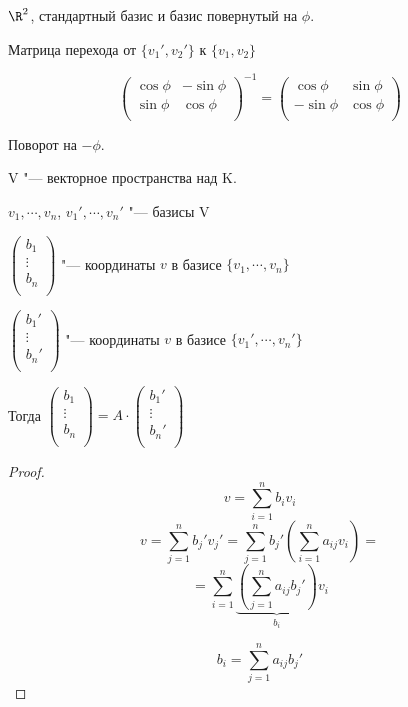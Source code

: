 \begin{exmp}
$\R^2$, стандартный базис и базис повернутый на $\phi$.

Матрица перехода от $\{v_1', v_2'\}$ к $\{v_1, v_2\}$

$$ 
\begin{pmatrix}
\cos \phi & -\sin \phi\\
\sin \phi & \cos \phi\\
\end{pmatrix}^{-1}
=
\begin{pmatrix}
\cos \phi & \sin \phi\\
-\sin \phi & \cos \phi\\
\end{pmatrix}
$$

Поворот на $-\phi$.
\end{exmp}

\begin{theorem}
V "--- векторное пространства над K.

$v_1, \cdots, v_n$, $v_1', \cdots, v_n'$ "--- базисы V

$\begin{pmatrix}
b_1\\
\vdots\\
b_n\\
\end{pmatrix}$ "--- координаты $v$ в базисе $\{v_1, \cdots, v_n\}$ 


$\begin{pmatrix}
b_1'\\
\vdots\\
b_n'\\
\end{pmatrix}$ "--- координаты $v$ в базисе $\{v_1', \cdots, v_n'\}$

Тогда $\begin{pmatrix}
b_1\\
\vdots\\
b_n\\
\end{pmatrix} = A \cdot 
\begin{pmatrix}
b_1'\\
\vdots\\
b_n'\\
\end{pmatrix}$
\end{theorem}

\begin{proof}
$$v = \sum_{i = 1}^{n}b_i v_i$$
$$v = \sum_{j = 1}^{n}b_{j}'v_{j}' = \sum_{j = 1}^{n}b_j'(\sum_{i = 1}^{n}a_{ij}v_i) = $$
$$= \sum_{i = 1}^{n}\underbrace{(\sum_{j = 1}^{n}a_{ij}b_j')}_{b_i}v_i $$

$$b_i = \sum_{j = 1}^{n}a_{ij}b_{j}'$$
\end{proof}

